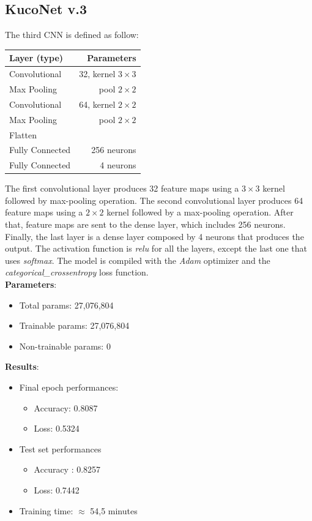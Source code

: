 \documentclass[11pt]{article}
\begin{document}
\subsection{KucoNet v.3}
The third CNN is defined as follow:
\begin{table}[H]
	\begin{center}
		\begin{tabular}{|l|r|}
			\hline
			\textbf{Layer (type)} & \textbf{Parameters} \\
			\hline
			Convolutional & 32, kernel $3 \times 3$ \\
			\hline
			Max Pooling & pool $2 \times 2$ \\
			\hline
			Convolutional & 64, kernel $2 \times 2$ \\
			\hline
			Max Pooling & pool $2 \times 2$ \\
			\hline
			Flatten & \\
			\hline
			Fully Connected & 256 neurons  \\
			\hline
			Fully Connected & 4 neurons \\
			\hline 
		\end{tabular}
	\end{center}
\end{table}
The first convolutional layer produces 32 feature maps using a $3 \times 3$ kernel followed by max-pooling operation. The second convolutional layer produces 64 feature maps using a $2 \times 2$ kernel followed by a max-pooling operation. After that, feature maps are sent to the dense layer, which includes 256 neurons. Finally, the last layer is a dense layer  composed by 4 neurons that produces the output. The activation function is \textit{relu} for all the layers, except the last one that uses \textit{softmax}.  The model is compiled with the \textit{Adam} optimizer and the \textit{categorical\_crossentropy} loss function. \\
\textbf{Parameters}:
\begin{itemize}
	\item Total params: 27,076,804
	\item Trainable params: 27,076,804
	\item Non-trainable params: 0
\end{itemize}
\textbf{Results}:
\begin{itemize}
	\item Final epoch performances:
	\begin{itemize}
		\item Accuracy: 0.8087
		\item Loss: 0.5324
	\end{itemize}
	\item Test set performances
	\begin{itemize}
		\item Accuracy : 0.8257
		\item Loss: 0.7442
	\end{itemize}
	\item Training time: $\approx$ 54,5 minutes
\end{itemize}
\end{document}
